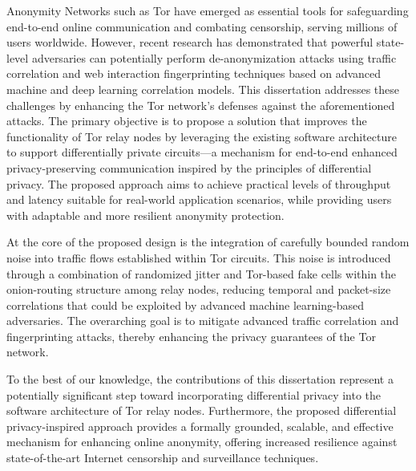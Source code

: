 
%

Anonymity Networks such as Tor have emerged as essential tools for safeguarding end-to-end online communication and combating censorship, serving millions of users worldwide. However, recent research has demonstrated that powerful state-level adversaries can potentially perform de-anonymization attacks using traffic correlation and web interaction fingerprinting techniques based on advanced machine and deep learning correlation models. This dissertation addresses these challenges by enhancing the Tor network's defenses against the aforementioned attacks. The primary objective is to propose a solution that improves the functionality of Tor relay nodes by leveraging the existing software architecture to support differentially private circuits—a mechanism for end-to-end enhanced privacy-preserving communication inspired by the principles of differential privacy. The proposed approach aims to achieve practical levels of throughput and latency suitable for real-world application scenarios, while providing users with adaptable and more resilient anonymity protection. 

At the core of the proposed design is the integration of carefully bounded random noise into traffic flows established within Tor circuits. This noise is introduced through a combination of randomized jitter and Tor-based fake cells within the onion-routing structure among relay nodes, reducing temporal and packet-size correlations that could be exploited by advanced machine learning-based adversaries. The overarching goal is to mitigate advanced traffic correlation and fingerprinting attacks, thereby enhancing the privacy guarantees of the Tor network. 

To the best of our knowledge, the contributions of this dissertation represent a potentially significant step toward incorporating differential privacy into the software architecture of Tor relay nodes. Furthermore, the proposed differential privacy-inspired approach provides a formally grounded, scalable, and effective mechanism for enhancing online anonymity, offering increased resilience against state-of-the-art Internet censorship and surveillance techniques.


